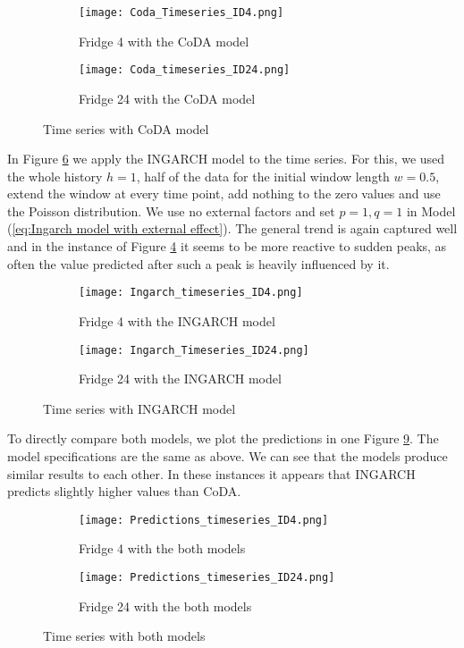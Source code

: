 \begin{figure}[htb!]
\centering
\begin{subfigure}[b]{0.45\textwidth}
\texttt{[image: Coda\_Timeseries\_ID4.png]}
\caption{Fridge 4 with the CoDA model}
\label{fig:Coda Fridge 4}
\end{subfigure}
\hfill
\begin{subfigure}[b]{0.45\textwidth}
\texttt{[image: Coda\_timeseries\_ID24.png]}
\caption{Fridge 24 with the CoDA model}
\label{fig:Coda Fridge 24}
\end{subfigure}
\caption{Time series with CoDA model}
\label{fig:TS Coda}
\end{figure}

In Figure \ref{fig:TS Ingarch} we apply the INGARCH model to the time series. For this, we used the whole history $h=1$, half of the data for the initial window length $w=0.5$, extend the window at every time point, add nothing to the zero values and use the Poisson distribution. We use no external factors and set $p=1, q=1$ in Model (\ref{eq:Ingarch model with external effect}). The general trend is again captured well and in the instance of Figure \ref{fig:Ingarch Fridge 4} it seems to be more reactive to sudden peaks, as often the value predicted after such a peak is heavily influenced by it.

\begin{figure}[htb]
\centering
\begin{subfigure}[b]{0.45\textwidth}
\texttt{[image: Ingarch\_timeseries\_ID4.png]}
\caption{Fridge 4 with the INGARCH model}
\label{fig:Ingarch Fridge 4}
\end{subfigure}
\hfill
\begin{subfigure}[b]{0.45\textwidth}
\texttt{[image: Ingarch\_Timeseries\_ID24.png]}
\caption{Fridge 24 with the INGARCH model}
\label{fig:Ingarch Fridge 24}
\end{subfigure}
\caption{Time series with INGARCH model}
\label{fig:TS Ingarch}
\end{figure}


To directly compare both models, we plot the predictions in one Figure \ref{fig:TS Both}. The model specifications are the same as above. We can see that the models produce similar results to each other. In these instances it appears that INGARCH predicts slightly higher values than CoDA. 

\begin{figure}[htb!]
\centering
\begin{subfigure}[b]{0.8\textwidth}
\texttt{[image: Predictions\_timeseries\_ID4.png]}
\caption{Fridge 4 with the both models}
\label{fig:Both Fridge 4}
\end{subfigure}
\hfill
\begin{subfigure}[b]{0.8\textwidth}
\texttt{[image: Predictions\_timeseries\_ID24.png]}
\caption{Fridge 24 with the both models}
\label{fig:Both Fridge 24}
\end{subfigure}
\caption{Time series with both models}
\label{fig:TS Both}
\end{figure}


